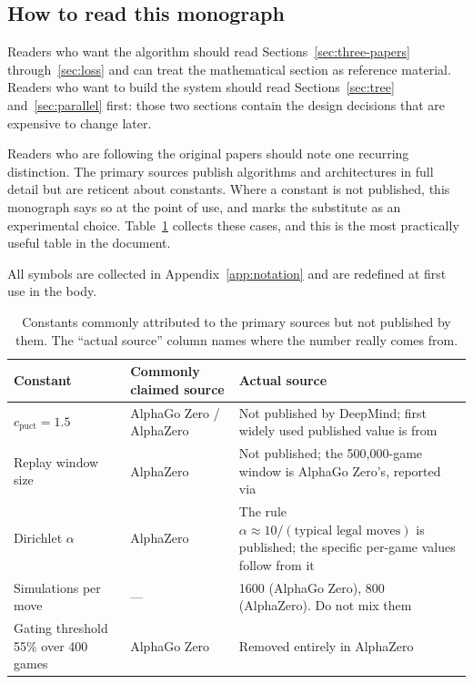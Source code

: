\subsection{How to read this monograph}

Readers who want the algorithm should read Sections~\ref{sec:three-papers}
through~\ref{sec:loss} and can treat the mathematical section as reference
material. Readers who want to build the system should read
Sections~\ref{sec:tree} and~\ref{sec:parallel} first: those two sections contain
the design decisions that are expensive to change later.

Readers who are following the original papers should note one recurring
distinction. The primary sources publish algorithms and architectures in full
detail but are reticent about constants. Where a constant is not published, this
monograph says so at the point of use, and marks the substitute as an
experimental choice. Table~\ref{tab:folklore} collects these cases, and this is
the most practically useful table in the document.

All symbols are collected in Appendix~\ref{app:notation} and are redefined at
first use in the body.

\begin{table}[t]
\centering
\small
\caption{Constants commonly attributed to the primary sources but not published
by them. The ``actual source'' column names where the number really comes from.}
\label{tab:folklore}
\begin{tabularx}{\textwidth}{@{}l l X@{}}
\toprule
Constant & Commonly claimed source & Actual source \\
\midrule
$c_{\mathrm{puct}} = 1.5$ & AlphaGo Zero / AlphaZero & Not published by DeepMind;
first widely used published value is from \citet{tian2019elf} \\
Replay window size & AlphaZero & Not published; the 500{,}000-game window is
AlphaGo Zero's, reported via \citet{tian2019elf} \\
Dirichlet $\alpha$ & AlphaZero & The rule $\alpha \approx 10 / (\text{typical legal moves})$
is published; the specific per-game values follow from it \\
Simulations per move & --- & 1600 (AlphaGo Zero), 800 (AlphaZero). Do not mix
them \\
Gating threshold 55\% over 400 games & AlphaGo Zero & Removed entirely in
AlphaZero \\
\bottomrule
\end{tabularx}
\end{table}
